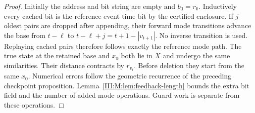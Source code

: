 \begin{proof}
Initially the address and bit string are empty and $b_0=r_0$.
Inductively every cached bit is the reference event-time bit by the
certified enclosure. If $j$ oldest pairs are dropped after appending,
their forward mode transitions advance the base from $t-\ell$ to
$t-\ell+j=t+1-|v_{t+1}|$. No inverse transition is used.
Replaying cached pairs therefore follows exactly the reference mode path.
The true state at the retained base and $x_0$ both lie in $X$ and undergo
the same similarities. Their distance contracts by $r_{v_t}$. Before
deletion they start from the same $x_0$. Numerical errors follow the
geometric recurrence of the preceding checkpoint proposition.
Lemma~\ref{III:M:lem:feedback-length} bounds the extra bit field and the number
of added mode operations. Guard work is separate from these operations.
\end{proof}
